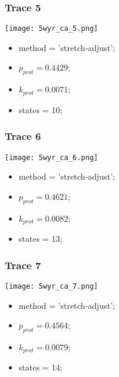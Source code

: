 \subsubsection{Trace 5}
\begin{minipage}[c]{0.7\textwidth}
    \texttt{[image: 5wyr\_ca\_5.png]}
\end{minipage}
\hfill
\begin{minipage}[c]{0.45\textwidth}
    \begin{itemize}
        \item method = 'stretch-adjust';
        \item $p_{prot}=0.4429$;
        \item $k_{prot}=0.0071$;
        \item states = 10;
    \end{itemize}
\end{minipage}

\subsubsection{Trace 6}
\begin{minipage}[c]{0.7\textwidth}
    \texttt{[image: 5wyr\_ca\_6.png]}
\end{minipage}
\hfill
\begin{minipage}[c]{0.45\textwidth}
    \begin{itemize}
        \item method = 'stretch-adjust';
        \item $p_{prot}=0.4621$;
        \item $k_{prot}=0.0082$;
        \item states = 13;
    \end{itemize}
\end{minipage}

\subsubsection{Trace 7}
\begin{minipage}[c]{0.7\textwidth}
    \texttt{[image: 5wyr\_ca\_7.png]}
\end{minipage}
\hfill
\begin{minipage}[c]{0.45\textwidth}
    \begin{itemize}
        \item method = 'stretch-adjust';
        \item $p_{prot}=0.4564$;
        \item $k_{prot}=0.0079$;
        \item states = 14;
    \end{itemize}
\end{minipage}

